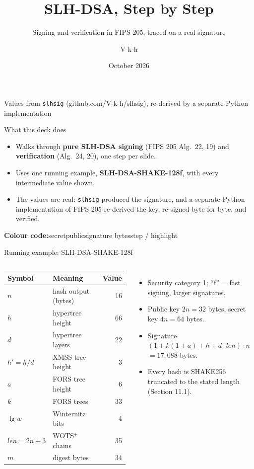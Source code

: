 \documentclass[aspectratio=169,11pt]{beamer}
\title{SLH-DSA, Step by Step}
\subtitle{Signing and verification in FIPS 205, traced on a real signature}
\author{V-k-h}
\date{October 2026}
\newcommand{\sk}[1]{\textcolor{secret}{#1}}
\newcommand{\pk}[1]{\textcolor{pub}{#1}}
\newcommand{\sg}[1]{\textcolor{sig}{#1}}
\begin{document}
\begin{frame}
  \titlepage
  \centering\footnotesize\textcolor{quiet}{Values from \texttt{slhsig} (github.com/V-k-h/slhsig), re-derived by a separate Python implementation}
\end{frame}

\begin{frame}{What this deck does}
  \begin{itemize}
    \item Walks through \textbf{pure SLH-DSA signing} (FIPS 205 Alg.~22, 19) and \textbf{verification} (Alg.~24, 20), one step per slide.
    \item Uses one running example, \textbf{SLH-DSA-SHAKE-128f}, with every intermediate value shown.
    \item The values are real: \texttt{slhsig} produced the signature, and a separate Python implementation of FIPS 205 re-derived the key, re-signed byte for byte, and verified.
  \end{itemize}
  \vspace{4mm}
  \textbf{Colour code:}\quad \sk{secret}\quad \pk{public}\quad \sg{signature bytes}\quad \textcolor{accent}{step / highlight}
\end{frame}

\begin{frame}{Running example: SLH-DSA-SHAKE-128f}
  \begin{columns}[T]
    \centering
    \begin{tabular}{@{}l l r@{}}
      \toprule
      Symbol & Meaning & Value \\
      \midrule
      $n$ & hash output (bytes) & 16 \\
      $h$ & hypertree height & 66 \\
      $d$ & hypertree layers & 22 \\
      $h'=h/d$ & XMSS tree height & 3 \\
      $a$ & FORS tree height & 6 \\
      $k$ & FORS trees & 33 \\
      $\lg w$ & Winternitz bits & 4 \\
      $\mathit{len}=2n+3$ & WOTS$^+$ chains & 35 \\
      $m$ & digest bytes & 34 \\
      \bottomrule
    \end{tabular}
    \begin{itemize}\small
      \item Security category 1; ``f'' = fast signing, larger signatures.
      \item Public key $2n = 32$ bytes, secret key $4n = 64$ bytes.
      \item Signature $(1 + k(1+a) + h + d\cdot\mathit{len})\cdot n$ $= 17{,}088$ bytes.
      \item Every hash is SHAKE256 truncated to the stated length (Section 11.1).
    \end{itemize}
  \end{columns}
\end{frame}
\end{document}
